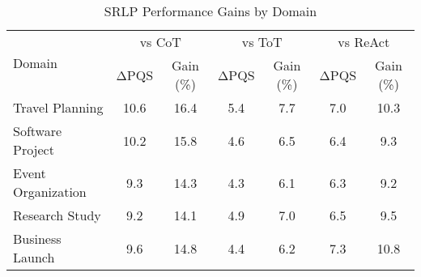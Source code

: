 \begin{table}[htbp]
\centering
\caption{SRLP Performance Gains by Domain}
\label{tab:domain_gains}
\begin{tabular}{lcccccc}
\toprule
\multirow{2}{*}{Domain} & \multicolumn{2}{c}{vs CoT} & \multicolumn{2}{c}{vs ToT} & \multicolumn{2}{c}{vs ReAct} \\
\cmidrule(lr){2-3} \cmidrule(lr){4-5} \cmidrule(lr){6-7}
 & ΔPQS & Gain (\%) & ΔPQS & Gain (\%) & ΔPQS & Gain (\%) \\
\midrule
Travel Planning & 10.6 & 16.4 & 5.4 & 7.7 & 7.0 & 10.3 \\
Software Project & 10.2 & 15.8 & 4.6 & 6.5 & 6.4 & 9.3 \\
Event Organization & 9.3 & 14.3 & 4.3 & 6.1 & 6.3 & 9.2 \\
Research Study & 9.2 & 14.1 & 4.9 & 7.0 & 6.5 & 9.5 \\
Business Launch & 9.6 & 14.8 & 4.4 & 6.2 & 7.3 & 10.8 \\
\bottomrule
\end{tabular}
\end{table}